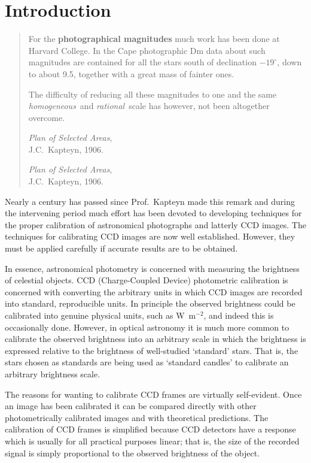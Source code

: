 \documentclass[twoside,11pt]{article}
\newenvironment{latexonly}{}{}
\newcommand{\xlabel}[1]{}
\begin{document}
\section{\xlabel{INTRO}\label{INTRO}Introduction}

\begin{quote}
For the {\bf photographical magnitudes} much work has been done at
Harvard College.  In the Cape photographic Dm data about such magnitudes
are contained for all the stars south of declination $-19^{\circ}$,
down to about 9.5, together with a great mass of fainter ones.

The difficulty of reducing all these magnitudes to one and the same
{\it homogeneous}\, and {\it rational}\, scale has however, not been
altogether overcome.

\begin{latexonly}
{\it Plan of Selected Areas},    \raggedleft \\
J.C.~Kapteyn, 1906.              \raggedleft
\end{latexonly}
\begin{htmlonly}
{\it Plan of Selected Areas}, \\
J.C.~Kapteyn, 1906.
\end{htmlonly}
\end{quote}

Nearly a century has passed since Prof.~Kapteyn made this remark and
during the intervening period much effort has been devoted to
developing techniques for the proper calibration of astronomical
photographs and latterly CCD images.  The techniques for calibrating
CCD images are now well established.  However, they must be applied
carefully if accurate results are to be obtained.

In essence, astronomical photometry is concerned with measuring the
brightness of celestial objects.  CCD (Charge-Coupled Device) photometric
calibration is concerned with converting the arbitrary units in which CCD
images are recorded into standard, reproducible units.  In principle the
observed brightness could be calibrated into genuine physical units,
such as W~m$^{-2}$, and indeed this is occasionally done.  However, in
optical astronomy it is much more common to calibrate the observed
brightness into an arbitrary scale in which the brightness is
expressed relative to the brightness of well-studied `standard' stars.
That is, the stars chosen as standards are being used as `standard
candles' to calibrate an arbitrary brightness scale.

The reasons for wanting to calibrate CCD frames are virtually
self-evident.  Once an image has been calibrated it can be compared
directly with other photometrically calibrated images and with theoretical
predictions.  The calibration of CCD frames is simplified because CCD
detectors have a response which is usually for all practical purposes
linear; that is, the size of the recorded signal is simply proportional
to the observed brightness of the object.
\end{document}
